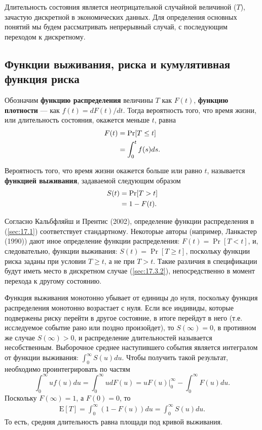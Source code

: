 \noindent
Длительность состояния является неотрицательной случайной величиной ($T$), зачастую дискретной в экономических данных. Для определения основных понятий мы будем рассматривать непрерывный случай, с последующим переходом к дискретному.


\subsection{Функции выживания, риска и кумулятивная функция риска}\label{sec:17.3.1}

\noindent
Обозначим \textbf{функцию распределения} величины $T$ как $F(t)$, \textbf{функцию плотности}  --- как $f(t) = dF(t) / dt$. Тогда вероятность того, что время жизни, или длительность состояния, окажется меньше $t$, равна
    \begin{align}
    \label{eq:17.1}
    F(t) &= \Pr[T \le t]\\
    &= \int^{t}_{0} f(s)ds. \notag
    \end{align}

Вероятность того, что время жизни окажется больше или равно $t$, называется \textbf{функцией выживания}, задаваемой следующим образом
    \begin{align}
    \label{eq:17.2}
    S(t) &= \Pr[T > t]\\
    &= 1 - F(t). \notag
    \end{align}

Согласно Кальбфляйш и Прентис (2002), определение функции распределения в (\ref{sec:17.1}) соответствует стандартному. Некоторые авторы (например, Ланкастер (1990)) дают иное определение функции распределения: $F(t) = \Pr[T < t]$, и, следовательно, функции выживания: $S(t) = \Pr[T\ge t]$, поскольку функции риска заданы при условии $T\ge t$, а не при $T>t$.
Такие различия в спецификации будут иметь место в дискретном случае (\ref{sec:17.3.2}), непосредственно в момент перехода к другому состоянию. 

Функция выживания монотонно убывает от единицы до нуля, поскольку функция распределения монотонно возрастает с нуля. Если все индивиды, которые подвержены риску перейти в другое состояние, в итоге перейдут в него (т.е. исследуемое событие рано или поздно произойдет), то $S(\infty) = 0$, в противном же случае $S(\infty) > 0$, и распределение длительностей называется несобственным. Выборочное среднее наступившего события является интегралом от функции выживания: $\int^{\infty}_{0} S(u)du$. Чтобы получить такой результат, необходимо проинтегрировать по частям
    $$\int^{\infty}_{0}uf(u)du = \int^{\infty}_{0}udF(u) = uF(u)|^{\infty}_{0} - \int^{\infty}_{0}F(u)du.$$
Поскольку $F(\infty) = 1$, а $F(0) = 0$, то
    \begin{align}
    \label{eq:17.3}
    \mathrm{E}[T] = \int^{\infty}_{0} (1-F(u))du = \int^{\infty}_{0} S(u)du.
    \end{align}
То есть, средняя длительность равна площади под кривой выживания.

